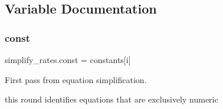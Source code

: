 \subsection{Variable Documentation}
\mbox{\label{namespacesimplify__rates_a39faabc858790d5788b9077e58bd20fc}} 
\subsubsection{\texorpdfstring{const}{const}}
{\footnotesize\ttfamily simplify\+\_\+rates.\+const = constants\mbox{[}i\mbox{]}}



First pass from equation simplification. 


\begin{DoxyItemize}
\item this round identifies equations that are exclusively numeric 
\end{DoxyItemize}